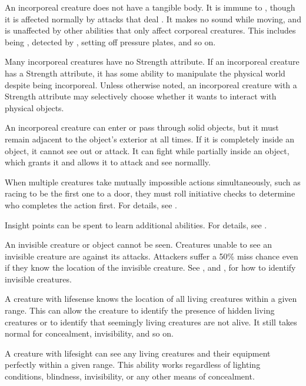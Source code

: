  An incorporeal creature does not have a tangible body.
It is immune to , though it is affected normally by attacks that deal .
It makes no sound while moving, and is unaffected by other abilities that only affect corporeal creatures.
This includes being , detected by , setting off pressure plates, and so on.

Many incorporeal creatures have no Strength attribute.
If an incorporeal creature has a Strength attribute, it has some ability to manipulate the physical world despite being incorporeal.
Unless otherwise noted, an incorporeal creature with a Strength attribute may selectively choose whether it wants to interact with physical objects.

An incorporeal creature can enter or pass through solid objects, but it must remain adjacent to the object's exterior at all times.
If it is completely inside an object, it cannot see out or attack.
It can fight while partially inside an object, which grants it  and allows it to attack and see normallly.

 When multiple creatures take mutually impossible actions simultaneously, such as racing to be the first one to a door, they must roll initiative checks to determine who completes the action first.
For details, see .

 Insight points can be spent to learn additional abilities.
For details, see .

 An invisible creature or object cannot be seen. Creatures unable to see an invisible creature are  against its attacks. Attackers suffer a 50\% miss chance even if they know the location of the invisible creature. See , and , for how to identify invisible creatures.

 A creature with lifesense knows the location of all living creatures within a given range.
This can allow the creature to identify the presence of hidden living creatures or to identify that seemingly living creatures are not alive.
It still takes normal  for concealment, invisibility, and so on.

 A creature with lifesight can see any living creatures and their equipment perfectly within a given range.
This ability works regardless of lighting conditions, blindness, invisibility, or any other means of concealment.

